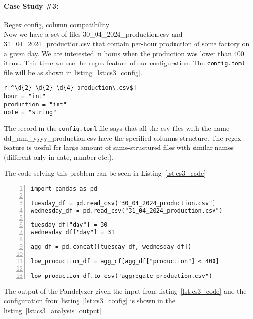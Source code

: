 \paragraph{Case Study \#3:} Regex config, column compatibility \\

Now we have a set of files 30\_04\_2024\_production.csv and 31\_04\_2024\_production.csv that contain per-hour production
of some factory on a given day.
We are interested in hours when the production was lower than 400 items.
This time we use the regex feature of our configuration.
The \verb|config.toml| file will be as shown in listing~\ref{lst:cs3_config}.

\begin{lstlisting}[caption=config.toml of the second case study, label={lst:cs3_config}, captionpos=b]
r[^\d{2}_\d{2}_\d{4}_production\.csv$]
hour = "int"
production = "int"
note = "string"
\end{lstlisting}

The record in the \verb|config.toml| file says that all the csv files with the name dd\_mm\_yyyy\_production.csv have the
specified columns structure.
The regex feature is useful for large amount of same-structured files with similar names (different only in date,
number etc.).

The code solving this problem can be seen in Listing~\ref{lst:cs3_code}

\begin{lstlisting}[caption=Solution of the third case study in Pandas, label={lst:cs3_code}, captionpos=b, numbers=left]
import pandas as pd

tuesday_df = pd.read_csv("30_04_2024_production.csv")
wednesday_df = pd.read_csv("31_04_2024_production.csv")

tuesday_df["day"] = 30
wednesday_df["day"] = 31

agg_df = pd.concat([tuesday_df, wednesday_df])

low_production_df = agg_df[agg_df["production"] < 400]

low_production_df.to_csv("aggregate_production.csv")
\end{lstlisting}

The output of the Pandalyzer given the input from listing~\ref{lst:cs3_code} and the configuration from
listing~\ref{lst:cs3_config} is shown in the listing~\ref{lst:cs3_analysis_output}


